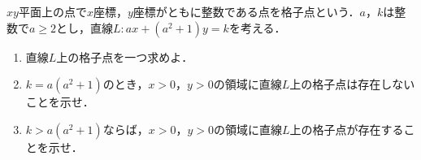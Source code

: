 \documentclass[../../main.tex]{subfiles}
\begin{document}
$xy$平面上の点で$x$座標，$y$座標がともに整数である点を格子点という．$a$，$k$は整数で$a\ge 2$とし，直線$L: ax+(a^2+1)y=k$を考える．
\begin{enumerate}
  \item 直線$L$上の格子点を一つ求めよ．
  \item $k=a(a^2+1)$のとき，$x>0$，$y>0$の領域に直線$L$上の格子点は存在しないことを示せ．
  \item $k>a(a^2+1)$ならば，$x>0$，$y>0$の領域に直線$L$上の格子点が存在することを示せ．
\end{enumerate}
\end{document}
